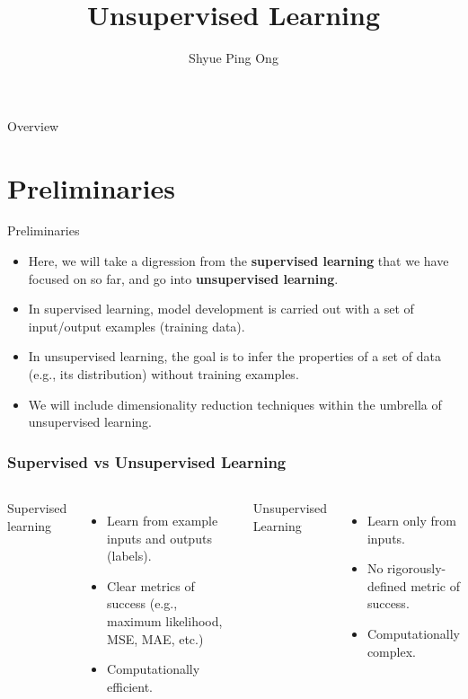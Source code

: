 \documentclass[aspectratio=169]{beamer}
\title[Unsupervised Learning]{Unsupervised Learning}
\author{Shyue Ping Ong}
\institute[UCSD]{University of California, San Diego\\
\medskip
}
\date{\classyear} %
\begin{document}
\begin{frame}
    \titlepage %
\end{frame}


\begin{frame}{Overview}
    \tableofcontents
\end{frame}


\section{Preliminaries}

\begin{frame}{Preliminaries}
    \begin{itemize}
        \item Here, we will take a digression from the \textbf{supervised learning} that we have focused on so far, and go into \textbf{unsupervised learning}.
        \item In supervised learning, model development is carried out with a set of input/output examples (training data). 
        \item In unsupervised learning, the goal is to infer the properties of a set of data (e.g., its distribution) without training examples.
        \item We will include dimensionality reduction techniques within the umbrella of unsupervised learning.
    \end{itemize}
\end{frame}

\begin{frame}
\frametitle{Supervised vs Unsupervised Learning}
\begin{columns}
Supervised learning
\begin{itemize}
    \item Learn from example inputs and outputs (labels).
    \item Clear metrics of success (e.g., maximum likelihood, MSE, MAE, etc.)
    \item Computationally efficient.
\end{itemize}
Unsupervised Learning
\begin{itemize}
    \item Learn only from inputs.
    \item No rigorously-defined metric of success.
    \item Computationally complex.
\end{itemize}

\end{columns}
\end{frame} 
\end{document}
